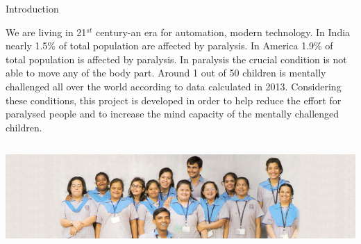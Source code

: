 \documentclass[14pt]{article}
\begin{document}
\break
\begin{center}
{\Huge Introduction}
\end{center}
We are living in 21$^{st}$ century-an era for automation, modern technology. In India nearly 1.5\% of total population are affected by paralysis. In America 1.9\% of total population is affected by paralysis. In paralysis the crucial condition is not able to move any of the body part. 
Around 1 out of 50 children is mentally challenged all over the world according to data calculated in 2013. Considering these conditions, this project is developed in order to help reduce the effort for paralysed people and to increase the mind capacity of the mentally challenged children.
\begin{center}
	\graphicspath{ {images/} }
	\includegraphics[width=16cm, height=4cm]{Mentally_challenged}
\end{center}
\end{document}
